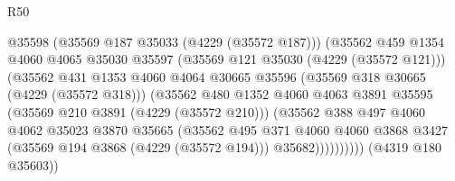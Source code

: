 \begin{lexlean}{R50}
\begin{coremodule}
                                            @35598
                                            (@35569 @187 @35033 (@4229 (@35572 @187)))
                                            (@35562
                                              @459
                                              @1354
                                              @4060
                                              @4065
                                              @35030
                                              @35597
                                              (@35569 @121 @35030 (@4229 (@35572 @121)))
                                              (@35562
                                                @431
                                                @1353
                                                @4060
                                                @4064
                                                @30665
                                                @35596
                                                (@35569 @318 @30665 (@4229 (@35572 @318)))
                                                (@35562
                                                  @480
                                                  @1352
                                                  @4060
                                                  @4063
                                                  @3891
                                                  @35595
                                                  (@35569 @210 @3891 (@4229 (@35572 @210)))
                                                  (@35562
                                                    @388
                                                    @497
                                                    @4060
                                                    @4062
                                                    @35023
                                                    @3870
                                                    @35665
                                                    (@35562
                                                      @495
                                                      @371
                                                      @4060
                                                      @4060
                                                      @3868
                                                      @3427
                                                      (@35569 @194 @3868 (@4229 (@35572 @194)))
                                                      @35682))))))))))
                                  (@4319 @180 @35603))

\end{coremodule}
\end{lexlean}
